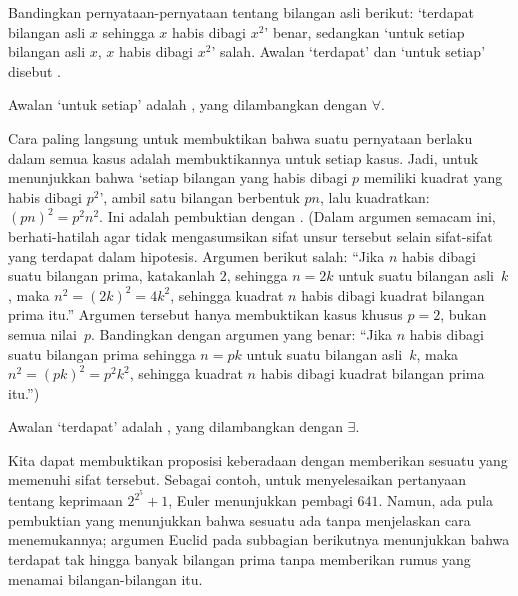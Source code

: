 %
Bandingkan pernyataan-pernyataan tentang bilangan asli berikut:
`terdapat bilangan asli \( x \) sehingga \( x \) habis dibagi \( x^2 \)'
benar, sedangkan
`untuk setiap bilangan asli \( x \), \( x \) habis dibagi \( x^2 \)'
salah.
Awalan `terdapat' dan `untuk setiap' disebut
.

Awalan `untuk setiap' adalah
,
yang dilambangkan dengan \( \forall \).

Cara paling langsung untuk membuktikan bahwa suatu pernyataan berlaku
dalam semua kasus adalah membuktikannya untuk setiap kasus.
Jadi, untuk menunjukkan bahwa `setiap bilangan yang habis dibagi \( p \)
memiliki kuadrat yang habis dibagi \( p^2 \)', ambil satu bilangan berbentuk
\( pn \), lalu kuadratkan: \( (pn)^2=p^2n^2 \).
Ini adalah pembuktian dengan .
(Dalam argumen semacam ini, berhati-hatilah agar tidak mengasumsikan sifat
unsur tersebut selain sifat-sifat yang terdapat dalam hipotesis.
Argumen berikut salah:
``Jika \( n \) habis dibagi suatu bilangan prima, katakanlah \( 2 \),
sehingga \( n=2k \) untuk suatu bilangan asli~$k$, maka
\( n^2=(2k)^2=4k^2 \), sehingga kuadrat $n$ habis dibagi kuadrat bilangan
prima itu.''
Argumen tersebut hanya membuktikan kasus khusus \( p=2 \), bukan semua
nilai~\( p \).
Bandingkan dengan argumen yang benar:
``Jika \( n \) habis dibagi suatu bilangan prima sehingga \( n=pk \)
untuk suatu bilangan asli~$k$, maka \( n^2=(pk)^2=p^2k^2 \), sehingga
kuadrat $n$ habis dibagi kuadrat bilangan prima itu.'')




Awalan `terdapat' adalah
,
yang dilambangkan dengan \( \exists \).


Kita dapat membuktikan proposisi keberadaan dengan memberikan sesuatu yang
memenuhi sifat tersebut. Sebagai contoh, untuk menyelesaikan pertanyaan
tentang keprimaan \( 2^{2^5}+1 \), Euler menunjukkan pembagi
\( 641 \)\cite{Sandifer}.
Namun, ada pula pembuktian yang menunjukkan bahwa sesuatu ada tanpa
menjelaskan cara menemukannya; argumen Euclid pada subbagian berikutnya
menunjukkan bahwa terdapat tak hingga banyak bilangan prima tanpa memberikan
rumus yang menamai bilangan-bilangan itu.

